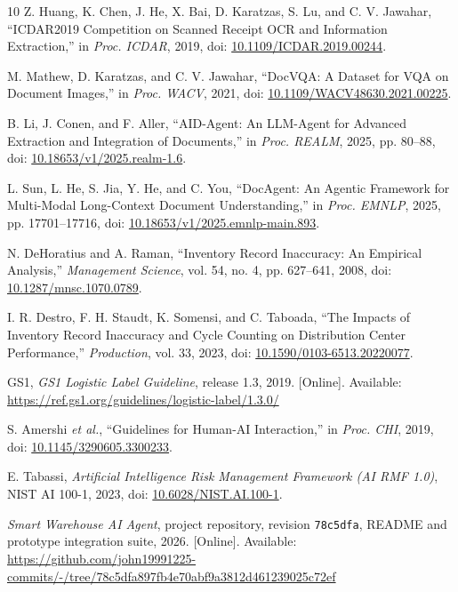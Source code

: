 \documentclass[conference]{IEEEtran}
\begin{document}
\begin{thebibliography}{10}
Z. Huang, K. Chen, J. He, X. Bai, D. Karatzas, S. Lu, and C. V. Jawahar, ``ICDAR2019 Competition on Scanned Receipt OCR and Information Extraction,'' in \emph{Proc. ICDAR}, 2019, doi: \url{10.1109/ICDAR.2019.00244}.

M. Mathew, D. Karatzas, and C. V. Jawahar, ``DocVQA: A Dataset for VQA on Document Images,'' in \emph{Proc. WACV}, 2021, doi: \url{10.1109/WACV48630.2021.00225}.

B. Li, J. Conen, and F. Aller, ``AID-Agent: An LLM-Agent for Advanced Extraction and Integration of Documents,'' in \emph{Proc. REALM}, 2025, pp. 80--88, doi: \url{10.18653/v1/2025.realm-1.6}.

L. Sun, L. He, S. Jia, Y. He, and C. You, ``DocAgent: An Agentic Framework for Multi-Modal Long-Context Document Understanding,'' in \emph{Proc. EMNLP}, 2025, pp. 17701--17716, doi: \url{10.18653/v1/2025.emnlp-main.893}.

N. DeHoratius and A. Raman, ``Inventory Record Inaccuracy: An Empirical Analysis,'' \emph{Management Science}, vol. 54, no. 4, pp. 627--641, 2008, doi: \url{10.1287/mnsc.1070.0789}.

I. R. Destro, F. H. Staudt, K. Somensi, and C. Taboada, ``The Impacts of Inventory Record Inaccuracy and Cycle Counting on Distribution Center Performance,'' \emph{Production}, vol. 33, 2023, doi: \url{10.1590/0103-6513.20220077}.

GS1, \emph{GS1 Logistic Label Guideline}, release 1.3, 2019. [Online]. Available: \url{https://ref.gs1.org/guidelines/logistic-label/1.3.0/}

S. Amershi \emph{et al.}, ``Guidelines for Human-AI Interaction,'' in \emph{Proc. CHI}, 2019, doi: \url{10.1145/3290605.3300233}.

E. Tabassi, \emph{Artificial Intelligence Risk Management Framework (AI RMF 1.0)}, NIST AI 100-1, 2023, doi: \url{10.6028/NIST.AI.100-1}.

{\raggedright \emph{Smart Warehouse AI Agent}, project repository, revision \texttt{78c5dfa}, README and prototype integration suite, 2026. [Online]. Available: \url{https://github.com/john19991225-commits/-/tree/78c5dfa897fb4e70abf9a3812d461239025c72ef}\par}
\end{thebibliography}
\end{document}
